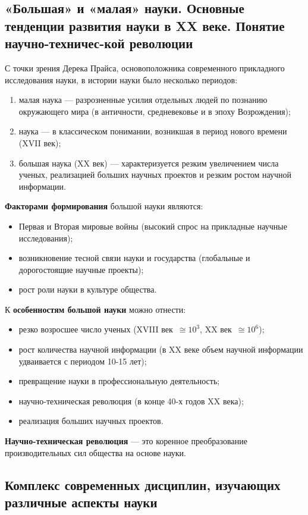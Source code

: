 \subsection{«Большая» и «малая» науки. Основные тенденции развития науки в XX веке. Понятие научно-техничес-кой революции}

С точки зрения Дерека Прайса, основоположника современного прикладного исследования науки, в истории науки было несколько периодов:
\begin{enumerate}
    \item малая наука — разрозненные усилия отдельных людей по познанию окружающего мира (в античности, средневековье и в эпоху Возрождения);
    \item наука — в классическом понимании, возникшая в период нового времени (XVII век);
    \item большая наука (XX век) — характеризуется резким увеличением числа ученых, реализацией больших научных проектов и резким ростом научной информации.
\end{enumerate}
\textbf{Факторами формирования} большой науки являются:
\begin{itemize}
    \item Первая и Вторая мировые войны (высокий спрос на прикладные научные исследования);
    \item возникновение тесной связи науки и государства (глобальные и дорогостоящие научные проекты);
    \item рост роли науки в культуре общества.
\end{itemize}
К \textbf{особенностям большой науки} можно отнести:
\begin{itemize}
    \item резко возросшее число ученых (XVIII век~$\cong 10^3$, XX век~$\cong 10^6$);
    \item рост количества научной информации (в XX веке объем научной информации удваивается с периодом 10-15 лет);
    \item превращение науки в профессиональную деятельность;
    \item научно-техническая революция (в конце 40-х годов XX века);
    \item реализация больших научных проектов.
\end{itemize}

\textbf{Научно-техническая революция} — это коренное преобразование производительных сил общества на основе науки.

\subsection{Комплекс современных дисциплин, изучающих различные аспекты науки}

